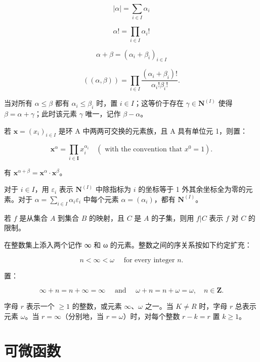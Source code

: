 \[
| \alpha | = \sum_ {i \in I} \alpha_ {i}
\]

\[
\alpha ! = \prod_ {i \in I} \alpha_ {i}!
\]

\[
\alpha + \beta = (\alpha_ {i} + \beta_ {i}) _ {i \in I}
\]

\[
((\alpha , \beta)) = \prod_ {i \in I} \frac {(\alpha_ {i} + \beta_ {i}) !}{\alpha_ {i} ! \beta_ {i} !}.
\]

当对所有 \(\alpha \leqslant \beta\) 都有 \(\alpha_{i} \leqslant \beta_{i}\) 时，置 \(i \in I\)；这等价于存在 \(\gamma \in \mathbf{N}^{(I)}\) 使得 \(\beta = \alpha + \gamma\)；此时该元素 \(\gamma\) 唯一，记作 \(\beta - \alpha\)。

若 \(\mathbf{x} = (x_i)_{i \in I}\) 是环 A 中两两可交换的元素族，且 A 具有单位元 1，则置：

\[
\mathbf {x} ^ {\alpha} = \prod_ {i \in \mathbf {I}} x _ {i} ^ {\alpha_ {i}} \quad (\text { with   the   convention   that } x ^ {0} = 1).
\]

有 \(\mathbf{x}^{\alpha +\beta} = \mathbf{x}^{\alpha}\cdot \mathbf{x}^{\beta}\)。

对于 \(i\in I\)，用 \(\varepsilon_{i}\) 表示 \(\mathbf{N}^{(I)}\) 中除指标为 \(i\) 的坐标等于 1 外其余坐标全为零的元素。对于 \(\alpha=\sum_{i\in I}\alpha_{i}\varepsilon_{i}\) 中每个元素 \(\alpha=(\alpha_{i})\)，都有 \(\mathbf{N}^{(I)}\)。


若 \(f\) 是从集合 \(A\) 到集合 \(B\) 的映射，且 \(C\) 是 \(A\) 的子集，则用 \(f|C\) 表示 \(f\) 对 \(C\) 的限制。


在整数集上添入两个记作 ∞ 和 ω 的元素。整数之间的序关系按如下约定扩充：

\[
n <   \infty <   \omega \quad \text { for   every   integer } n.
\]

置：

\[
\infty + n = n + \infty = \infty \quad \text { and } \quad \omega + n = n + \omega = \omega , \quad n \in \mathbf {Z}.
\]

字母 \(r\) 表示一个 \(\geqslant 1\) 的整数，或元素 \(\infty\)、\(\omega\) 之一。当 \(K \neq R\) 时，字母 \(r\) 总表示元素 \(\omega\)。当 \(r = \infty\)（分别地，当 \(r = \omega\)）时，对每个整数 \(r - k = r\) 置 \(k \geqslant 1\)。

\section{可微函数}

